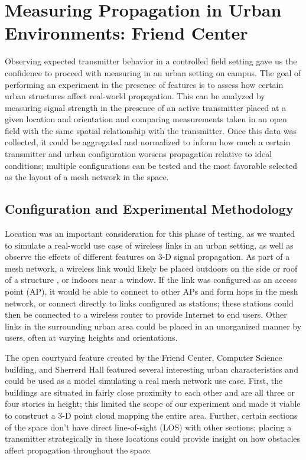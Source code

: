 \documentclass[pageno]{jpaper}
\begin{document}
\section{Measuring Propagation in Urban Environments: Friend Center}
Observing expected transmitter behavior in a controlled field setting gave us the confidence to proceed with measuring in an urban setting on campus. The goal of performing an experiment in the presence of features is to assess how certain urban structures affect real-world propagation. This can be analyzed by measuring signal strength in the presence of an active transmitter placed at a given location and orientation and comparing measurements taken in an open field with the same spatial relationship with the transmitter. Once this data was collected, it could be aggregated and normalized to inform how much a certain transmitter and urban configuration worsens propagation relative to ideal conditions; multiple configurations can be tested and the most favorable selected as the layout of a mesh network in the space.

\subsection{Configuration and Experimental Methodology}
Location was an important consideration for this phase of testing, as we wanted to simulate a real-world use case of wireless links in an urban setting, as well as observe the effects of different features on 3-D signal propagation. As part of a mesh network, a wireless link would likely be placed outdoors on the side or roof of a structure , or indoors near a window. If the link was configured as an access point (AP), it would be able to connect to other APs and form hops in the mesh network, or connect directly to links configured as stations; these stations could then be connected to a wireless router to provide Internet to end users. Other links in the surrounding urban area could be placed in an unorganized manner by users, often at varying heights and orientations.

The open courtyard feature created by the Friend Center, Computer Science building, and Sherrerd Hall featured several interesting urban characteristics and could be used as a model simulating a real mesh network use case. First, the buildings are situated in fairly close proximity to each other and are all three or four stories in height; this limited the scope of our experiment and made it viable to construct a 3-D point cloud mapping the entire area. Further, certain sections of the space don't have direct line-of-sight (LOS) with other sections; placing a transmitter strategically in these locations could provide insight on how obstacles affect propagation throughout the space. 
\end{document}
